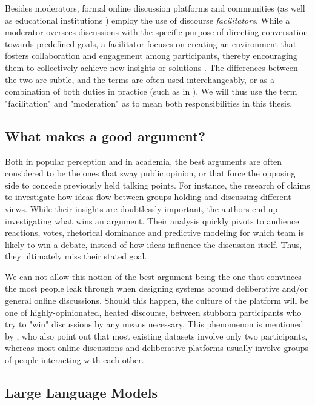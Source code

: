 Besides moderators, formal online discussion platforms and communities (as well as educational institutions \cite{Wang2008StudentfacilitatorsRI, Zhong2019ExploringTR}) employ the use of discourse \textit{facilitators}. While a moderator oversees discussions with the specific purpose of directing conversation towards predefined goals, a facilitator focuses on creating an environment that fosters collaboration and engagement among participants, thereby encouraging them to collectively achieve new insights or solutions \cite{wef_moderation}. The differences between the two are subtle, and the terms are often used interchangeably, or as a combination of both duties in practice (such as in \citet{Zhong2019ExploringTR, Carson2008}). We will thus use the term "facilitation" and "moderation" as to mean both responsibilities in this thesis. 

\subsection{What makes a good argument?}
\label{sec:background:good-argument}

Both in popular perception and in academia, the best arguments are often considered to be the ones that sway public opinion, or that force the opposing side to concede previously held talking points. For instance, the research of \citet{zhang2016-oxford} claims to investigate how ideas flow between groups holding and discussing different views. While their insights are doubtlessly important, the authors end up investigating what wins an argument. Their analysis quickly pivots to audience reactions, votes, rhetorical dominance and predictive modeling for which team is likely to win a debate, instead of how ideas influence the discussion itself. Thus, they ultimately miss their stated goal.

We can not allow this notion of the best argument being the one that convinces the most people leak through when designing systems around deliberative and/or general online discussions. Should this happen, the culture of the platform will be one of highly-opinionated, heated discourse, between stubborn participants who try to "win" discussions by any means necessary. This phenomenon is mentioned by \citet{karadzhov2023delidata}, who also point out that most existing datasets involve only two participants, whereas most online discussions and deliberative platforms usually involve groups of people interacting with each other. 


\subsection{Large Language Models}
\label{sec:background:llm}

